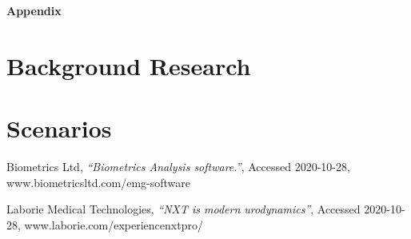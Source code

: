 \documentclass[12pt,a4paper]{article}
\begin{document}
\newpage
\begin{flushleft}
\textbf{{\Large Appendix}}
\end{flushleft}
\appendix
\section{Background Research}



\section{Scenarios}

\begin{thebibliography}{9}

  Biometrics Ltd,
  \textit{“Biometrics Analysis software.”},
  Accessed 2020-10-28,
  www.biometricsltd.com/emg-software
  
  Laborie Medical Technologies,
  \textit{“NXT is modern urodynamics”},
  Accessed 2020-10-28,
  www.laborie.com/experiencenxtpro/

\end{thebibliography}
\end{document}
